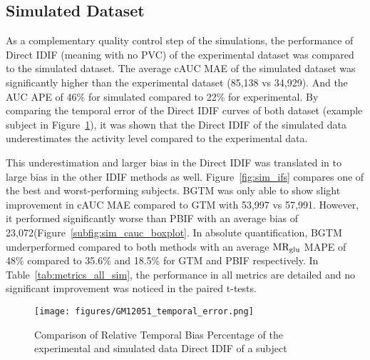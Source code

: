 \subsection{Simulated Dataset}
As a complementary quality control step of the simulations, the performance of Direct IDIF (meaning with no PVC) of the experimental dataset was compared to the simulated dataset.
The average cAUC MAE of the simulated dataset was significantly higher than the experimental dataset (85,138 vs 34,929).
And the AUC APE of 46\% for simulated compared to 22\% for experimental.
By comparing the temporal error of the Direct IDIF curves of both dataset (example subject in Figure~\ref{fig:sim_temporal_err}), it was shown that the Direct IDIF of the simulated data underestimates the activity level compared to the experimental data.

This underestimation and larger bias in the Direct IDIF was translated in to large bias in the other IDIF methods as well.
Figure~\ref{fig:sim_ifs} compares one of the best and worst-performing subjects.
BGTM was only able to show slight improvement in cAUC MAE compared to GTM with 53,997 vs 57,991.
However, it performed significantly worse than PBIF with an average bias of 23,072(Figure~\ref{subfig:sim_cauc_boxplot}.
In absolute quantification, BGTM underperformed compared to both methods with an average $\text{MR}_{\text{glu}}$ MAPE of 48\% compared to 35.6\% and 18.5\% for GTM and PBIF respectively.
In Table~\ref{tab:metrics_all_sim}, the performance in all metrics are detailed and no significant improvement was noticed in the paired t-tests.

\begin{figure}[h]
    \texttt{[image: figures/GM12051\_temporal\_error.png]}
    \caption{Comparison of Relative Temporal Bias Percentage of the experimental and simulated data Direct IDIF of a subject}
    \label{fig:sim_temporal_err}
\end{figure}

